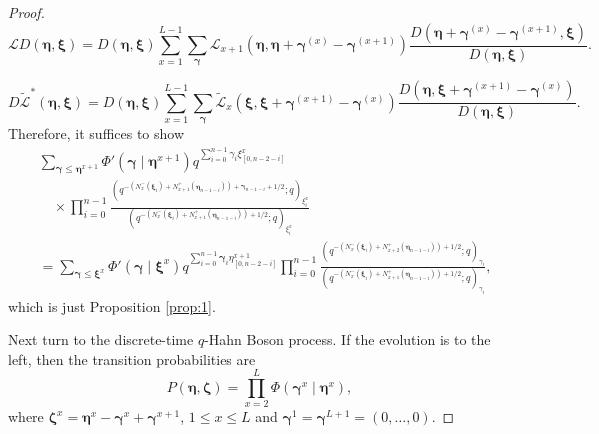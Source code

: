 \documentclass{ximera}
\begin{document}
\begin{proof}
\begin{equation*}
    \mathcal{L}D(\boldsymbol\eta,\boldsymbol\xi)=D(\boldsymbol\eta,\boldsymbol\xi)\sum_{x=1}^{L-1}\sum_{\boldsymbol\gamma}\mathcal{L}_{x+1}(\boldsymbol\eta,\boldsymbol\eta+\boldsymbol\gamma^{(x)}-\boldsymbol\gamma^{(x+1)})\frac{D(\boldsymbol\eta+\boldsymbol\gamma^{(x)}-\boldsymbol\gamma^{(x+1)},\boldsymbol\xi)}{D(\boldsymbol\eta,\boldsymbol\xi)}.
\end{equation*}

\begin{equation*}
    D\tilde{\mathcal{L}}^*(\boldsymbol\eta,\boldsymbol\xi)=D(\boldsymbol\eta,\boldsymbol\xi)\sum_{x=1}^{L-1}\sum_{\boldsymbol\gamma}\mathcal{\tilde{L}}_{x}(\boldsymbol\xi,\boldsymbol\xi+\boldsymbol\gamma^{(x+1)}-\boldsymbol\gamma^{(x)})\frac{D(\boldsymbol\eta,\boldsymbol\xi+\boldsymbol\gamma^{(x+1)}-\boldsymbol\gamma^{(x)})}{D(\boldsymbol\eta,\boldsymbol\xi)}.
\end{equation*}
Therefore, it suffices to show 
\begin{align*}
 &  \sum_{ \boldsymbol\gamma\le \boldsymbol\eta^{x+1}}\Phi'(\boldsymbol\gamma\mid\boldsymbol\eta^{x+1})q^{\sum_{i=0}^{n-1}\gamma_i\xi_{[0,n-2-i]}^{x}}\\
 &\quad\times \prod_{i=0}^{n-1}\frac{\left(q^{-\left(N_{x}^-(\boldsymbol\xi_i)+N_{x+1}^+(\boldsymbol\eta_{n-1-i})\right)+\boldsymbol\gamma_{n-1-i}+1/2};q\right)_{\xi_i^x}}{\left(q^{-\left(N_{x}^-(\boldsymbol\xi_i)+N_{x+1}^+(\boldsymbol\eta_{n-1-i})\right)+1/2};q\right)_{\xi_i^x}}\\
 &  = \sum_{\boldsymbol\gamma\le \boldsymbol\xi^{x}}\Phi'(\boldsymbol\gamma\mid\boldsymbol\xi^{x})q^{\sum_{i=0}^{n-1}\boldsymbol\gamma_i\eta_{[0,n-2-i]}^{x+1}}\prod_{i=0}^{n-1}\frac{\left(q^{-\left(N_{x}^-(\boldsymbol\xi_i)+N_{x+2}^+(\boldsymbol\eta_{n-1-i})\right)+1/2};q\right)_{\gamma_i}}{\left(q^{-\left(N_{x}^-(\boldsymbol\xi_i)+N_{x+1}^+(\boldsymbol\eta_{n-1-i})\right)+1/2};q\right)_{\gamma_i}} ,
\end{align*}
which is just Proposition \ref{prop:1}.

Next turn to the discrete-time $q$-Hahn Boson process.
If the evolution is to the left, then the transition probabilities are
\begin{equation*}
    P(\boldsymbol\eta,\boldsymbol\zeta)=\prod_{x=2}^L\Phi(\boldsymbol\gamma^x\mid\boldsymbol\eta^x),
\end{equation*}
where $\boldsymbol\zeta^x=\boldsymbol\eta^x-\boldsymbol\gamma^x+\boldsymbol\gamma^{x+1}$, $1\le x\le L$ and $\boldsymbol\gamma^1=\boldsymbol\gamma^{L+1}=(0,\ldots,0)$.


\end{proof}
\end{document}
